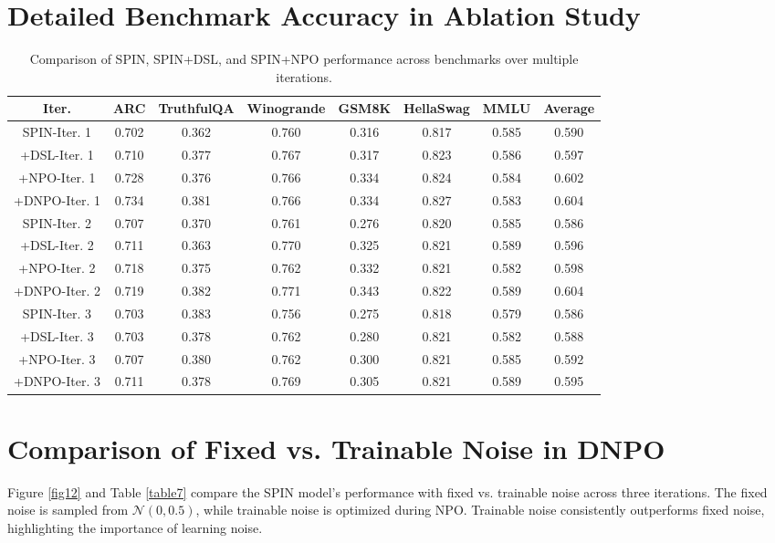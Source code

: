 \begin{appendices}
\section{Detailed Benchmark Accuracy in Ablation Study}
\label{appendix g}
\begin{table}[h]
\centering
\small
\renewcommand{\arraystretch}{0.8}
\caption{Comparison of SPIN, SPIN+DSL, and SPIN+NPO performance across benchmarks over multiple iterations.}
\begin{tabular}{cccccccc}
    \toprule
    \textbf{Iter.} & \textbf{ARC} & \textbf{TruthfulQA} & \textbf{Winogrande} & \textbf{GSM8K} & \textbf{HellaSwag} & \textbf{MMLU} & \textbf{Average} \\
    \midrule
    SPIN-Iter. 1   & 0.702 & 0.362 & 0.760 & 0.316 & 0.817 & 0.585 & 0.590 \\
    +DSL-Iter. 1 & 0.710 & 0.377 & 0.767 & 0.317 & 0.823 & 0.586 & 0.597 \\
    +NPO-Iter. 1 & 0.728 & 0.376 & 0.766 & 0.334 & 0.824 & 0.584 & 0.602 \\
    +DNPO-Iter. 1 & 0.734 & 0.381 & 0.766 & 0.334 & 0.827 & 0.583 & 0.604 \\
    \midrule
    SPIN-Iter. 2 & 0.707 & 0.370 & 0.761 & 0.276 & 0.820 & 0.585 & 0.586 \\
    +DSL-Iter. 2 & 0.711 & 0.363 & 0.770 & 0.325 & 0.821 & 0.589 & 0.596 \\
    +NPO-Iter. 2 & 0.718 & 0.375 & 0.762 & 0.332 & 0.821 & 0.582 & 0.598 \\
    +DNPO-Iter. 2 & 0.719 & 0.382 & 0.771 & 0.343 & 0.822 & 0.589 & 0.604 \\
    \midrule
    SPIN-Iter. 3 & 0.703 & 0.383 & 0.756 & 0.275 & 0.818 & 0.579 & 0.586 \\
    +DSL-Iter. 3 & 0.703 & 0.378 & 0.762 & 0.280 & 0.821 & 0.582 & 0.588 \\
    +NPO-Iter. 3 & 0.707 & 0.380 & 0.762 & 0.300 & 0.821 & 0.585 & 0.592 \\
    +DNPO-Iter. 3 & 0.711 & 0.378 & 0.769 & 0.305 & 0.821 & 0.589 & 0.595 \\
    
    \bottomrule
\end{tabular}
\label{table6}
\end{table}


\section{Comparison of Fixed vs. Trainable Noise in DNPO}
\label{appendix h}
Figure \ref{fig12} and Table \ref{table7} compare the SPIN model's performance with fixed vs. trainable noise across three iterations. The fixed noise is sampled from $\mathcal{N}(0, 0.5)$, while trainable noise is optimized during NPO. Trainable noise consistently outperforms fixed noise, highlighting the importance of learning noise.


\end{appendices}
